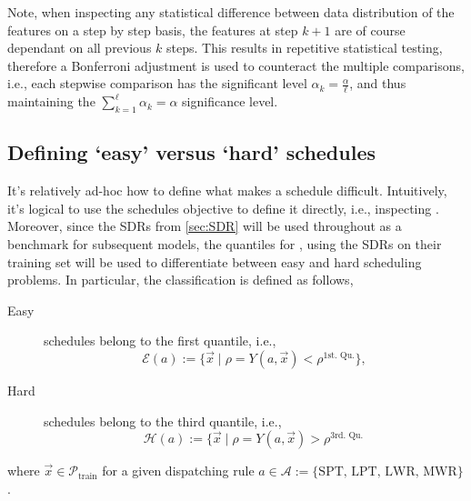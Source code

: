 Note, when inspecting any statistical difference between data distribution of the features on a step by step basis, the features at step $k+1$ are of course dependant on all previous $k$ steps. This results in repetitive statistical testing, therefore a Bonferroni adjustment is used to counteract the multiple comparisons, i.e., each stepwise comparison has the significant level $\alpha_k=\frac{\alpha}{\ell}$, and thus maintaining the $\sum_{k=1}^{\ell}\alpha_k=\alpha$ significance level.

\subsection{Defining `easy' versus `hard' schedules}\label{sec:diff:easyhard}
It's relatively ad-hoc how to define what makes a schedule difficult. Intuitively, it's logical to use the schedules objective to define it directly, i.e., inspecting \fullnamerho. Moreover, since the SDRs from \cref{sec:SDR} will be used throughout as a benchmark for subsequent models, the quantiles for \namerho, using the SDRs on their training set will be used to differentiate between easy and hard scheduling problems. In particular, the classification is defined as follows, 
\begin{description}
\item[Easy] schedules belong to the first quantile, i.e., \hfill \\
\begin{equation}\label{eq:easy}
\mathcal{E}(a):=\{\vec{x}\;|\;\rho=Y(a,\vec{x})<\rho^{\text{1st. Qu.}}\},
\end{equation} 
\item[Hard] schedules belong to the third quantile, i.e., \hfill \\
\begin{equation}\label{eq:hard}
\mathcal{H}(a):=\{\vec{x}\;|\;\rho=Y(a,\vec{x})>\rho^{\text{3rd. Qu.}}\,
\end{equation} 
\end{description}
where $\vec{x}\in\mathcal{P}_{\text{train}}$ for a given dispatching rule $a\in\mathcal{A}:=\{\text{SPT,~LPT,~LWR,~MWR}\}$.

